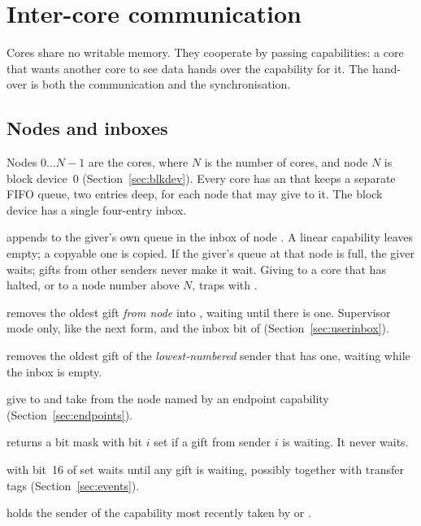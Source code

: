 \chapter{Inter-core communication}\label{ch:intercore}

Cores share no writable memory. They cooperate by passing capabilities: a core that wants another core
to see data hands over the capability for it. The hand-over is both the communication and the
synchronisation.

\section{Nodes and inboxes}\label{sec:inbox}

Nodes $0 \ldots N-1$ are the cores, where $N$ is the number of cores, and node $N$ is block device~0
(Section~\ref{sec:blkdev}). Every core has an  that keeps a separate FIFO queue, two entries
deep, for each node that may give to it. The block device has a single four-entry inbox.

\begin{description}[leftmargin=1em,style=nextline]
\item[\insn{cgive cs, rx}] appends  to the giver's own queue in the inbox of node . A
  linear capability leaves  empty; a copyable one is copied. If the giver's queue at that node is
  full, the giver waits; gifts from other senders never make it wait. Giving to a core that has halted,
  or to a node number above $N$, traps with .
\item[\insn{ctake cd, rs}] removes the oldest gift \emph{from node}  into , waiting until
  there is one. Supervisor mode only, like the next form,  and the inbox bit of 
  (Section~\ref{sec:userinbox}).
\item[\insn{ctake cd}] removes the oldest gift of the \emph{lowest-numbered} sender that has one,
  waiting while the inbox is empty.
\item[\insn{csend cs, ce}, \insn{crecv cd, ce}] give to and take from the node named by an endpoint
  capability (Section~\ref{sec:endpoints}).
\item[\insn{cpoll rd}] returns a bit mask with bit $i$ set if a gift from sender $i$ is waiting. It
  never waits.
\item[\insn{tany rd, rs}] with bit~16 of  set waits until any gift is waiting, possibly together
  with transfer tags (Section~\ref{sec:events}).
\item[\csr{takefrom}] holds the sender of the capability most recently taken by  or
  .
\end{description}

